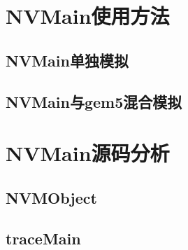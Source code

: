 \documentclass[11pt,fleqn]{book} %
\begin{document}

\pagestyle{fancy} %


\chapter{NVMain使用方法}
\section{NVMain单独模拟}

  \vspace{1em}

  \vspace{2em}

\section{NVMain与gem5混合模拟}

  \vspace{1em}



\pagestyle{fancy} %


\chapter{NVMain源码分析}
\section{NVMObject}

  \vspace{1em}

  \vspace{2em}

\section{traceMain}
\end{document}
